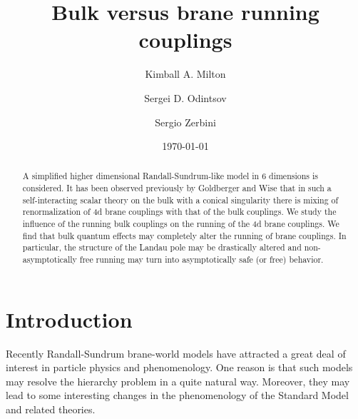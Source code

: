\documentclass[a4paper,aps,prl,preprint,groupedaddress,showpacs,nobibnotes,tightenlines]{revtex4}
\begin{document}


\title{Bulk versus brane running couplings}


\author{Kimball A. Milton}



\author{Sergei D.  Odintsov}

\author{Sergio Zerbini}



\date{\today}

\begin{abstract}
A simplified higher dimensional Randall-Sundrum-like model in 6 
dimensions is 
considered. It has been observed previously by Goldberger and Wise that
 in such a self-interacting scalar theory on the bulk with a conical 
singularity there is mixing of renormalization of 4d brane couplings 
 with that of the bulk couplings.
We study the influence of the running bulk couplings on the running of the
4d brane couplings.  We find that bulk quantum effects may 
completely alter the running of brane couplings. In particular, the 
structure of the Landau 
pole may be drastically altered and  non-asymptotically free running may turn 
into asymptotically safe (or free) behavior.
\end{abstract}





\maketitle










\section{Introduction}
Recently Randall-Sundrum brane-world models \cite{RS} have attracted a great 
deal of interest in particle physics and phenomenology. One reason is 
that such models may resolve the hierarchy problem in a quite natural way.
Moreover, they may lead to some interesting changes in the
phenomenology of the Standard Model and related theories. 
\end{document}
